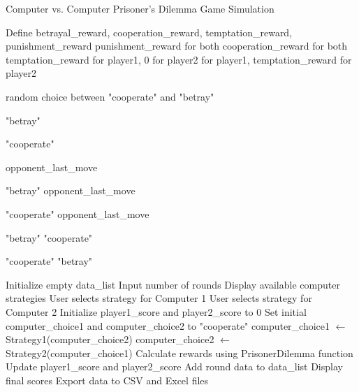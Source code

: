 \documentclass{article}
\begin{document}
\begin{algorithm}
\caption{Computer vs. Computer Prisoner's Dilemma Game Simulation}
\begin{algorithmic}[1]

    \State Define betrayal\_reward, cooperation\_reward, temptation\_reward, punishment\_reward
        \State \Return punishment\_reward for both
        \State \Return cooperation\_reward for both
        \State \Return temptation\_reward for player1, 0 for player2
        \State {} for player1, temptation\_reward for player2
    \EndIf
\EndProcedure

    \State \Return random choice between "cooperate" and "betray"
\EndProcedure

    \State \Return "betray"
\EndProcedure

    \State \Return "cooperate"
\EndProcedure

    \State \Return opponent\_last\_move
\EndProcedure

        \State \Return "betray"
    \Else
        \State \Return opponent\_last\_move
    \EndIf
\EndProcedure

        \State \Return "cooperate"
    \Else
        \State \Return opponent\_last\_move
    \EndIf
\EndProcedure

        \State \Return "betray"
    \Else
        \State \Return "cooperate"
    \EndIf
\EndProcedure

        \State \Return "cooperate"
    \Else
        \State \Return "betray"
    \EndIf
\EndProcedure

    \State Initialize empty data\_list
    \State Input number of rounds
    \State Display available computer strategies
    \State User selects strategy for Computer 1
    \State User selects strategy for Computer 2
    \State Initialize player1\_score and player2\_score to 0
    \State Set initial computer\_choice1 and computer\_choice2 to "cooperate"
        \State computer\_choice1 $\gets$ Strategy1(computer\_choice2)
        \State computer\_choice2 $\gets$ Strategy2(computer\_choice1)
        \State Calculate rewards using PrisonerDilemma function
        \State Update player1\_score and player2\_score
        \State Add round data to data\_list
    \EndFor
    \State Display final scores
    \State Export data to CSV and Excel files
\EndProcedure


\end{algorithmic}
\end{algorithm}
\end{document}
